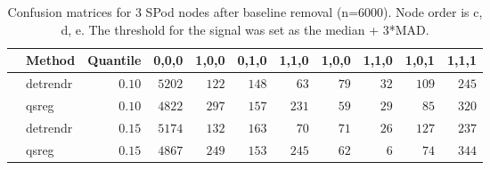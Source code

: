 \begin{table}[!tbp]
\caption{Confusion matrices for 3 SPod nodes after baseline 
      removal (n=6000). Node order is c, d, e. The threshold for the signal was 
      set as the median + 3*MAD.\label{confusion}} 
\begin{center}
\begin{tabular}{llrrrrrrrrr}
\hline\hline
\multicolumn{1}{l}{}&\multicolumn{1}{c}{Method}&\multicolumn{1}{c}{Quantile}&\multicolumn{1}{c}{0,0,0}&\multicolumn{1}{c}{1,0,0}&\multicolumn{1}{c}{0,1,0}&\multicolumn{1}{c}{1,1,0}&\multicolumn{1}{c}{1,0,0}&\multicolumn{1}{c}{1,1,0}&\multicolumn{1}{c}{1,0,1}&\multicolumn{1}{c}{1,1,1}\tabularnewline
\hline
&detrendr&$0.10$&$5202$&$122$&$148$&$ 63$&$79$&$32$&$109$&$245$\tabularnewline
&qsreg&$0.10$&$4822$&$297$&$157$&$231$&$59$&$29$&$ 85$&$320$\tabularnewline
&detrendr&$0.15$&$5174$&$132$&$163$&$ 70$&$71$&$26$&$127$&$237$\tabularnewline
&qsreg&$0.15$&$4867$&$249$&$153$&$245$&$62$&$ 6$&$ 74$&$344$\tabularnewline
\hline
\end{tabular}\end{center}
\end{table}
